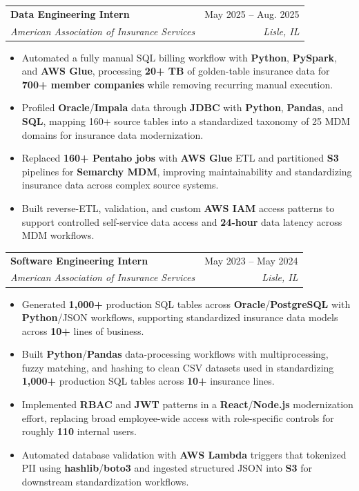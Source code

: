 \documentclass[letterpaper,11pt]{article}
\makeatletter
\newcommand{\resumeItem}[1]{
  \item\small{
    {#1 \vspace{-1pt}}
  }
}
\newcommand{\resumeSubheading}[4]{
  \vspace{-1pt}\item
    \begin{tabular*}{0.97\textwidth}[t]{l@{\extracolsep{\fill}}r}
      \textbf{#1} & #2 \\
      \textit{\small#3} & \textit{\small #4} \\
    \end{tabular*}\vspace{-3pt}
}
\newcommand{\resumeItemListStart}{\begin{itemize}[leftmargin=0.16in, itemsep=0pt, topsep=0pt, parsep=0pt]}
\newcommand{\resumeItemListEnd}{\end{itemize}\vspace{-4pt}}
\makeatother
\begin{document}
    \resumeSubheading
      {Data Engineering Intern}{May 2025 -- Aug. 2025}
      {American Association of Insurance Services}{Lisle, IL}
      \resumeItemListStart
        \resumeItem{Automated a fully manual SQL billing workflow with \textbf{Python}, \textbf{PySpark}, and \textbf{AWS Glue}, processing \textbf{20+ TB} of golden-table insurance data for \textbf{700+ member companies} while removing recurring manual execution.}
        \resumeItem{Profiled \textbf{Oracle}/\textbf{Impala} data through \textbf{JDBC} with \textbf{Python}, \textbf{Pandas}, and \textbf{SQL}, mapping 160+ source tables into a standardized taxonomy of 25 MDM domains for insurance data modernization.}
        \resumeItem{Replaced \textbf{160+ Pentaho jobs} with \textbf{AWS Glue} ETL and partitioned \textbf{S3} pipelines for \textbf{Semarchy MDM}, improving maintainability and standardizing insurance data across complex source systems.}
        \resumeItem{Built reverse-ETL, validation, and custom \textbf{AWS IAM} access patterns to support controlled self-service data access and \textbf{24-hour} data latency across MDM workflows.}
      \resumeItemListEnd

    \resumeSubheading
      {Software Engineering Intern}{May 2023 -- May 2024}
      {American Association of Insurance Services}{Lisle, IL}
      \resumeItemListStart
        \resumeItem{Generated \textbf{1,000+} production SQL tables across \textbf{Oracle}/\textbf{PostgreSQL} with \textbf{Python}/JSON workflows, supporting standardized insurance data models across \textbf{10+} lines of business.}
        \resumeItem{Built \textbf{Python}/\textbf{Pandas} data-processing workflows with multiprocessing, fuzzy matching, and hashing to clean CSV datasets used in standardizing \textbf{1,000+} production SQL tables across \textbf{10+} insurance lines.}
        \resumeItem{Implemented \textbf{RBAC} and \textbf{JWT} patterns in a \textbf{React}/\textbf{Node.js} modernization effort, replacing broad employee-wide access with role-specific controls for roughly \textbf{110} internal users.}
        \resumeItem{Automated database validation with \textbf{AWS Lambda} triggers that tokenized PII using \textbf{hashlib}/\textbf{boto3} and ingested structured JSON into \textbf{S3} for downstream standardization workflows.}
      \resumeItemListEnd
\end{document}
